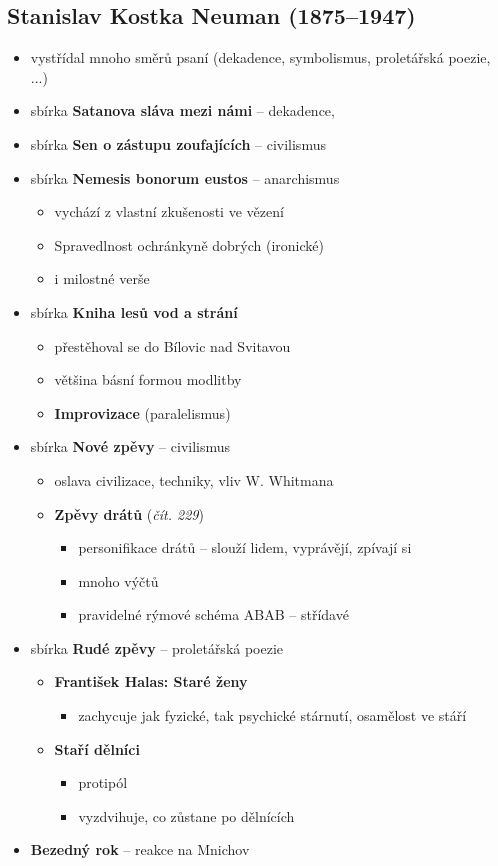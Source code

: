 \subsection{Stanislav Kostka Neuman (1875--1947)}
\begin{itemize}
\item vystřídal mnoho směrů psaní (dekadence, symbolismus, proletářská poezie, ...)
\item sbírka \textbf{Satanova sláva mezi námi} -- dekadence, 
\item sbírka \textbf{Sen o zástupu zoufajících} -- civilismus
\item sbírka \textbf{Nemesis bonorum eustos} -- anarchismus
	\begin{itemize}
	\item vychází z vlastní zkušenosti ve vězení
	\item Spravedlnost ochránkyně dobrých (ironické)
	\item i milostné verše
	\end{itemize}
\item sbírka \textbf{Kniha lesů vod a strání}
	\begin{itemize}
	\item přestěhoval se do Bílovic nad Svitavou
	\item většina básní formou modlitby
	\item \textbf{Improvizace} (paralelismus)
	\end{itemize}
\item sbírka \textbf{Nové zpěvy} -- civilismus 
	\begin{itemize}
	\item oslava civilizace, techniky, vliv W. Whitmana
	\item \textbf{Zpěvy drátů} (\textit{čít. 229})
		\begin{itemize}
		\item personifikace drátů -- slouží lidem, vyprávějí, zpívají si
		\item mnoho výčtů
		\item pravidelné rýmové schéma ABAB -- střídavé
		\end{itemize}
	\end{itemize}
\item sbírka \textbf{Rudé zpěvy} -- proletářská poezie
	\begin{itemize}
	\item \textbf{František Halas: Staré ženy}
		\begin{itemize}
		\item zachycuje jak fyzické, tak psychické stárnutí, osamělost ve stáří
		\end{itemize}
	\item \textbf{Staří dělníci}
		\begin{itemize}
		\item protipól
		\item vyzdvihuje, co zůstane po dělnících
		\end{itemize}
	\end{itemize}
\item \textbf{Bezedný rok} -- reakce na Mnichov
\end{itemize}

